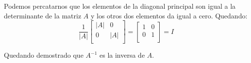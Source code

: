 \documentclass[12pt,titlepage]{article}
\begin{document}
\begin{enumerate}
\begin{equation}
\end{equation}
Podemos percatarnos que los elementos de la diagonal principal son igual a la determinante de la matriz $A$ y los otros dos elementos da igual a cero. Quedando:
\begin{equation}
\frac{1}{\left|A\right|}\left[\begin{matrix}\left|A\right|&0\\0&\left|A\right|\\\end{matrix}\right]=\left[\begin{matrix}1&0\\0&1\\\end{matrix}\right]=I\nonumber
\end{equation}

Quedando demostrado que $A^{-1}$ es la inversa de $A$.


\end{enumerate}
\end{document}
